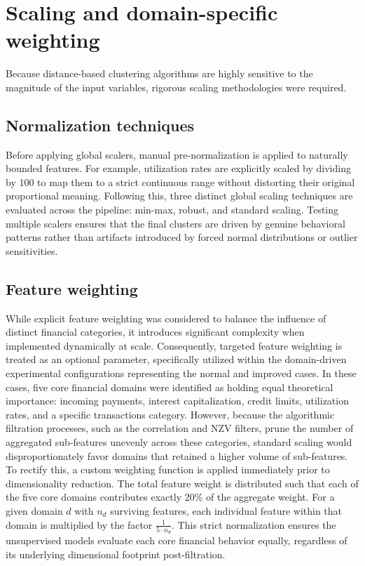     \section{Scaling and domain-specific weighting}
    \label{sec:scaling}
    Because distance-based clustering algorithms are highly sensitive to the magnitude of the input variables, rigorous scaling methodologies were required.
    
        \subsection{Normalization techniques}
        Before applying global scalers, manual pre-normalization is applied to naturally bounded features.
        For example, utilization rates are explicitly scaled by dividing by 100 to map them to a strict continuous range without distorting their original proportional meaning.
        Following this, three distinct global scaling techniques are evaluated across the pipeline: min-max, robust, and standard scaling.
        Testing multiple scalers ensures that the final clusters are driven by genuine behavioral patterns rather than artifacts introduced by forced normal distributions or outlier sensitivities.
        
        \subsection{Feature weighting}
        \label{subsec:FeatureWeigting}
        While explicit feature weighting was considered to balance the influence of distinct financial categories, it introduces significant complexity when implemented dynamically at scale.
        Consequently, targeted feature weighting is treated as an optional parameter, specifically utilized within the domain-driven experimental configurations representing the normal and improved cases.
        In these cases, five core financial domains were identified as holding equal theoretical importance: incoming payments, interest capitalization, credit limits, utilization rates, and a specific transactions category.
        However, because the algorithmic filtration processes, such as the correlation and NZV filters, prune the number of aggregated sub-features unevenly across these categories, standard scaling would disproportionately favor domains that retained a higher volume of sub-features.
        To rectify this, a custom weighting function is applied immediately prior to dimensionality reduction.
        The total feature weight is distributed such that each of the five core domains contributes exactly 20\% of the aggregate weight.
        For a given domain $d$ with $n_d$ surviving features, each individual feature within that domain is multiplied by the factor $\frac{1}{5 \cdot n_d}$.
        This strict normalization ensures the unsupervised models evaluate each core financial behavior equally, regardless of its underlying dimensional footprint post-filtration.
        

